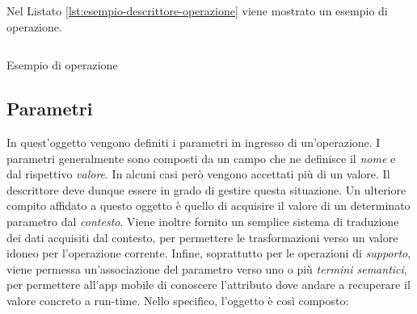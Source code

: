 Nel Listato \ref{lst:esempio-descrittore-operazione} viene mostrato un esempio di operazione.

\begin{listing}[H]
	\inputminted{json}{5-implementazione-backend/Codice/esempio_descrittore_operazione.json}
	\caption{Esempio di operazione}
	\label{lst:esempio-descrittore-operazione}
\end{listing}

\subsection{Parametri\label{sec:descrittore-parametri}}

In quest'oggetto vengono definiti i parametri in ingresso di un'operazione. I parametri generalmente sono composti da un campo che ne definisce il \emph{nome} e dal rispettivo \emph{valore}. In alcuni casi però vengono accettati più di un valore. Il descrittore deve dunque essere in grado di gestire questa situazione. Un ulteriore compito affidato a questo oggetto è quello di acquisire il valore di un determinato parametro dal \emph{contesto}. Viene inoltre fornito un semplice sistema di traduzione dei dati acquisiti dal contesto, per permettere le trasformazioni verso un valore idoneo per l'operazione corrente. Infine, soprattutto per le operazioni di \emph{supporto}, viene permessa un'associazione del parametro verso uno o più \emph{termini semantici}, per permettere all'app mobile di conoscere l'attributo dove andare a recuperare il valore concreto a run-time. Nello specifico, l'oggetto è così composto:


